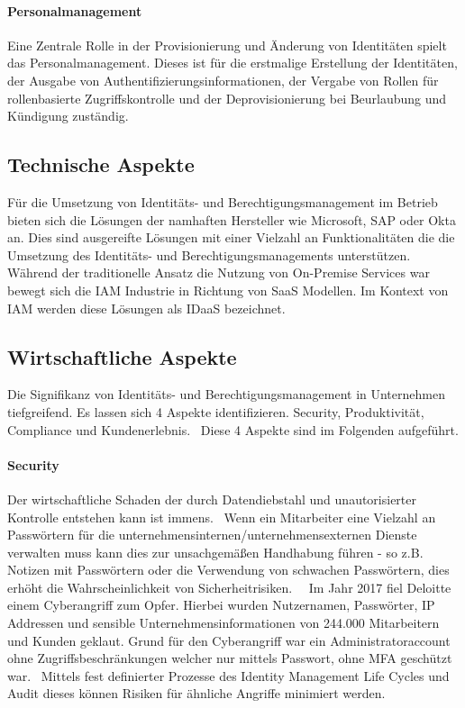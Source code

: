 \documentclass[12pt]{article}
\begin{document}
\paragraph{Personalmanagement}
Eine Zentrale Rolle in der Provisionierung und Änderung von Identitäten spielt das Personalmanagement. Dieses ist für die erstmalige Erstellung der Identitäten, der Ausgabe von Authentifizierungsinformationen, der Vergabe von Rollen für rollenbasierte Zugriffskontrolle und der Deprovisionierung bei Beurlaubung und Kündigung zuständig.~\cite{YOUNG20045}
\subsection{Technische Aspekte}
Für die Umsetzung von Identitäts- und Berechtigungsmanagement im Betrieb bieten sich die Lösungen der namhaften Hersteller wie Microsoft, SAP oder Okta an. Dies sind ausgereifte Lösungen mit einer Vielzahl an Funktionalitäten die die Umsetzung des Identitäts- und Berechtigungsmanagements unterstützen. Während der traditionelle Ansatz die Nutzung von On-Premise Services war bewegt sich die IAM Industrie in Richtung von SaaS Modellen. Im Kontext von IAM werden diese Lösungen als IDaaS bezeichnet.~\cite{kunz2014analyzing}
\subsection{Wirtschaftliche Aspekte}
Die Signifikanz von Identitäts- und Berechtigungsmanagement in Unternehmen tiefgreifend. Es lassen sich 4 Aspekte identifizieren. Security, Produktivität, Compliance und Kundenerlebnis.~\cite{mont2010economics}\cite{azhar2014economics} Diese 4 Aspekte sind im Folgenden aufgeführt.
\paragraph{Security}
Der wirtschaftliche Schaden der durch Datendiebstahl und unautorisierter Kontrolle entstehen kann ist immens.~\cite{azhar2014economics} Wenn ein Mitarbeiter eine Vielzahl an Passwörtern für die unternehmensinternen/unternehmensexternen Dienste verwalten muss kann dies zur unsachgemäßen Handhabung führen - so z.B. Notizen mit Passwörtern oder die Verwendung von schwachen Passwörtern, dies erhöht die Wahrscheinlichkeit von Sicherheitrisiken.~\cite{haag2012selecting}~\cite{azhar2014economics} Im Jahr 2017 fiel Deloitte einem Cyberangriff zum Opfer. Hierbei wurden Nutzernamen, Passwörter, IP Addressen und sensible Unternehmensinformationen von 244.000 Mitarbeitern und Kunden geklaut. Grund für den Cyberangriff war ein Administratoraccount ohne Zugriffsbeschränkungen welcher nur mittels Passwort, ohne MFA geschützt war.~\cite{deloitte2017} Mittels fest definierter Prozesse des Identity Management Life Cycles und Audit dieses können Risiken für ähnliche Angriffe minimiert werden.
\end{document}
